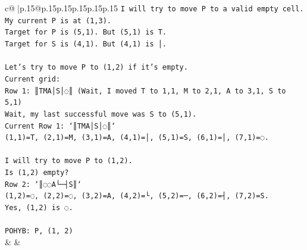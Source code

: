 \documentclass{article}
\begin{document}
{\begin{supertabular}{c@{$\;$}|p{.15\linewidth}@{}p{.15\linewidth}p{.15\linewidth}p{.15\linewidth}p{.15\linewidth}p{.15\linewidth}}
{{{\texttt{I will try to move P to a valid empty cell. My current P is at (1,3).} \\
\texttt{Target for P is (5,1). But (5,1) is T.} \\
\texttt{Target for S is (4,1). But (4,1) is │.} \\
\\ 
\texttt{Let's try to move P to (1,2) if it's empty.} \\
\texttt{Current grid:} \\
\texttt{Row 1: ║TMA│S│◌║ (Wait, I moved T to 1,1, M to 2,1, A to 3,1, S to 5,1)} \\
\texttt{Wait, my last successful move was S to (5,1).} \\
\texttt{Current Row 1: `║TMA│S│◌║`} \\
\texttt{(1,1)=T, (2,1)=M, (3,1)=A, (4,1)=│, (5,1)=S, (6,1)=│, (7,1)=◌.} \\
\\ 
\texttt{I will try to move P to (1,2).} \\
\texttt{Is (1,2) empty?} \\
\texttt{Row 2: `║◌◌A└─┤S║`} \\
\texttt{(1,2)=◌, (2,2)=◌, (3,2)=A, (4,2)=└, (5,2)=─, (6,2)=┤, (7,2)=S.} \\
\texttt{Yes, (1,2) is ◌.} \\
\\ 
\texttt{POHYB: P, (1, 2)} \\
            }
        }
    }
    & & \\ \\


\end{supertabular}}
\end{document}
